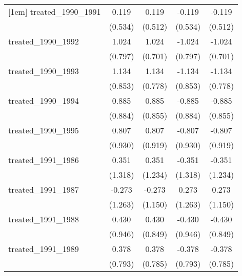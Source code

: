 {\begin{tabular}{l*{4}{c}}
[1em]
treated\_1990\_1991&       0.119         &       0.119         &      -0.119         &      -0.119         \\
            &     (0.534)         &     (0.512)         &     (0.534)         &     (0.512)         \\
[1em]
treated\_1990\_1992&       1.024         &       1.024         &      -1.024         &      -1.024         \\
            &     (0.797)         &     (0.701)         &     (0.797)         &     (0.701)         \\
[1em]
treated\_1990\_1993&       1.134         &       1.134         &      -1.134         &      -1.134         \\
            &     (0.853)         &     (0.778)         &     (0.853)         &     (0.778)         \\
[1em]
treated\_1990\_1994&       0.885         &       0.885         &      -0.885         &      -0.885         \\
            &     (0.884)         &     (0.855)         &     (0.884)         &     (0.855)         \\
[1em]
treated\_1990\_1995&       0.807         &       0.807         &      -0.807         &      -0.807         \\
            &     (0.930)         &     (0.919)         &     (0.930)         &     (0.919)         \\
[1em]
treated\_1991\_1986&       0.351         &       0.351         &      -0.351         &      -0.351         \\
            &     (1.318)         &     (1.234)         &     (1.318)         &     (1.234)         \\
[1em]
treated\_1991\_1987&      -0.273         &      -0.273         &       0.273         &       0.273         \\
            &     (1.263)         &     (1.150)         &     (1.263)         &     (1.150)         \\
[1em]
treated\_1991\_1988&       0.430         &       0.430         &      -0.430         &      -0.430         \\
            &     (0.946)         &     (0.849)         &     (0.946)         &     (0.849)         \\
[1em]
treated\_1991\_1989&       0.378         &       0.378         &      -0.378         &      -0.378         \\
            &     (0.793)         &     (0.785)         &     (0.793)         &     (0.785)         \\

\end{tabular}}
